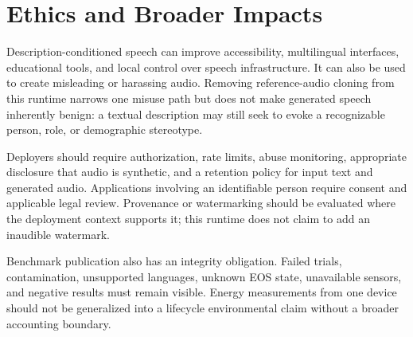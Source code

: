 \section{Ethics and Broader Impacts}

Description-conditioned speech can improve accessibility, multilingual
interfaces, educational tools, and local control over speech infrastructure.
It can also be used to create misleading or harassing audio. Removing
reference-audio cloning from this runtime narrows one misuse path but does not
make generated speech inherently benign: a textual description may still seek
to evoke a recognizable person, role, or demographic stereotype.

Deployers should require authorization, rate limits, abuse monitoring,
appropriate disclosure that audio is synthetic, and a retention policy for
input text and generated audio. Applications involving an identifiable person
require consent and applicable legal review. Provenance or watermarking should
be evaluated where the deployment context supports it; this runtime does not
claim to add an inaudible watermark.

Benchmark publication also has an integrity obligation. Failed trials,
contamination, unsupported languages, unknown EOS state, unavailable sensors,
and negative results must remain visible. Energy measurements from one device
should not be generalized into a lifecycle environmental claim without a
broader accounting boundary.
